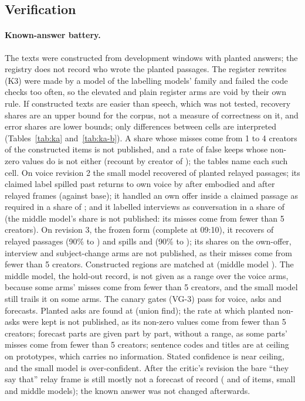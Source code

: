 \subsection{Verification}
\label{app:verification}

\paragraph{Known-answer battery.} The texts were constructed from development windows with planted answers; the
registry does not record who wrote the planted passages. The register rewrites (K3) were made by a model of the
labelling models' family and failed the code checks too often, so the elevated and plain register arms are void by
their own rule. If constructed texts are easier than speech, which was not tested, recovery shares are an upper bound
for the corpus, not a measure of correctness on it, and error shares are lower bounds; only differences between cells are interpreted
(Tables~\ref{tab:ka} and~\ref{tab:ka-b}). A share whose misses come from 1 to 4 creators of the constructed items is not
published, and a rate of false keeps whose non-zero values do is not either (recount by creator of \RecountStamp); the
tables name each such cell. On voice revision 2 the small model recovered \KaKoneRSmall{} of planted
relayed passages; its claimed label spilled past returns to own voice by \KaSpillE{} after embodied and \KaSpillR{}
after relayed frames (against base); it handled an own offer inside a claimed passage as required in a share of
\KaKfourVSmall; and it labelled interviews as conversation in a share of \KaCvSixSmall{} (the middle model's share is
not published: its misses come from fewer than 5 creators). On revision 3, the frozen form (complete at 09:10), it
recovers \KaKoneRSmallRevThree{} of relayed passages (90\% \KaKoneRSmallRevThreeLo{} to \KaKoneRSmallRevThreeHi) and
spills \KaSpillERevThree{} and \KaSpillRRevThree{} (90\% \KaSpillRRevThreeLo{} to \KaSpillRRevThreeHi); its shares on
the own-offer, interview and subject-change arms are not published, as their misses come from fewer than 5 creators.
Constructed regions are matched at \KaRegionsSmallRevThree{} (middle model \KaRegionsMiddleRevThree). The middle model,
the hold-out record, is not given as a range over the voice arms, because some arms' misses come from fewer than 5
creators, and the small model still trails it on some arms. The canary gates (VG-3) pass for voice, asks and
forecasts. Planted asks are found at \KaAsksFound{} (union find); the rate at which planted non-asks were kept is not
published, as its non-zero values come from fewer than 5 creators; forecast parts are given part by part, without a
range, as some parts' misses come from fewer than 5 creators; sentence codes and titles are at ceiling on prototypes,
which carries no information.
Stated confidence is near ceiling, and the small model is over-confident. After the critic's revision the bare ``they
say that'' relay frame is still mostly not a forecast of record (\KaBareFrameSmall{} and \KaBareFrameMiddle{} of
\KaBareFrameN{} items, small and middle models); the known answer was not changed afterwards.

